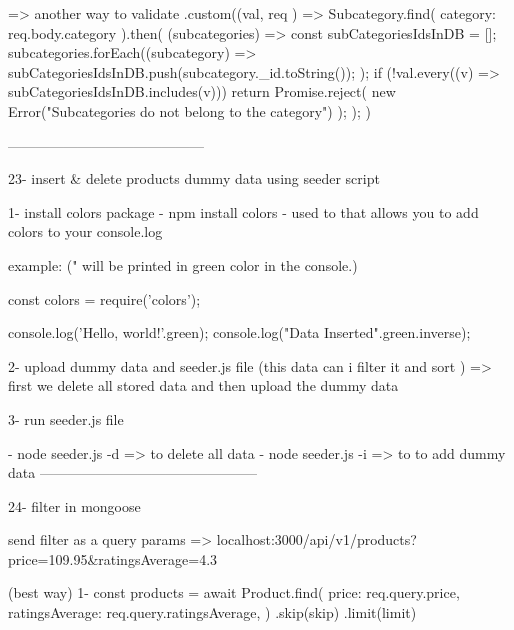                 => another way to validate 
                            .custom((val, { req }) => {
                                        Subcategory.find({ category: req.body.category }).then(
                                            (subcategories) => {
                                            const subCategoriesIdsInDB = [];
                                            subcategories.forEach((subcategory) => {
                                                subCategoriesIdsInDB.push(subcategory._id.toString());
                                            });
                                            if (!val.every((v) => subCategoriesIdsInDB.includes(v))) {
                                                return Promise.reject(
                                                new Error("Subcategories do not belong to the category")
                                                );
                                            }
                                            }
                                        );
                                        })


------------------------------------------

23- insert & delete products dummy data using seeder script

        1- install colors package  
                - npm install colors 
                - used to that allows you to add colors to your console.log 

                example: (" will be printed in green color in the console.)

                        const colors = require('colors');

                        console.log('Hello, world!'.green);
                        console.log("Data Inserted".green.inverse);

        2- upload dummy data and seeder.js file (this data can i filter it and sort )
             => first we delete all stored data and then upload the dummy data

        3- run seeder.js file

                - node seeder.js -d   => to delete all data 
                - node seeder.js -i    => to to add dummy data 
-----------------------------------------------

24- filter in mongoose 

     send filter as a query params =>    localhost:3000/api/v1/products?price=109.95&ratingsAverage=4.3

     (best way) 1-   const products = await Product.find({
                                                price: req.query.price,
                                                ratingsAverage: req.query.ratingsAverage,
                                            })
                                            .skip(skip)
                                            .limit(limit)


